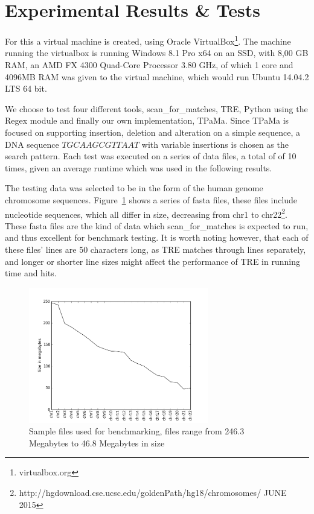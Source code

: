 \section{Experimental Results \& Tests}
For this a virtual machine is created, using Oracle VirtualBox\footnote{virtualbox.org}. The machine running the virtualbox is running Windows 8.1 Pro x64 on an SSD, with 8,00 GB RAM, an AMD FX 4300 Quad-Core Processor 3.80 GHz, of which 1 core and 4096MB RAM was given to the virtual machine, which would run Ubuntu 14.04.2 LTS 64 bit.

We choose to test four different tools, scan\_for\_matches, TRE, Python using the Regex module and finally our own implementation, TPaMa. Since TPaMa is focused on supporting insertion, deletion and alteration on a simple sequence, a DNA sequence $TGCAAGCGTTAAT$ with variable insertions is chosen as the search pattern. Each test was executed on a series of data files, a total of of 10 times, given an average runtime which was used in the following results.


The testing data was selected to be in the form of the human genome chromosome sequences. Figure~\ref{fig:size} shows a series of fasta files, these files include nucleotide sequences, which all differ in size, decreasing from chr1 to chr22\footnote{http://hgdownload.cse.ucsc.edu/goldenPath/hg18/chromosomes/ JUNE 2015}. These fasta files are the kind of data which scan\_for\_matches is expected to run, and thus excellent for benchmark testing. It is worth noting however, that each of these files' lines are 50 characters long, as TRE matches through lines separately, and longer or shorter line sizes might affect the performance of TRE in running time and hits.%
\begin{figure}[h!]
\centering
\includegraphics[width=0.7\textwidth]{Benchmarking/size.png}
\caption{Sample files used for benchmarking, files range from 246.3 Megabytes to 46.8 Megabytes in size}
\label{fig:size}
\end{figure}

